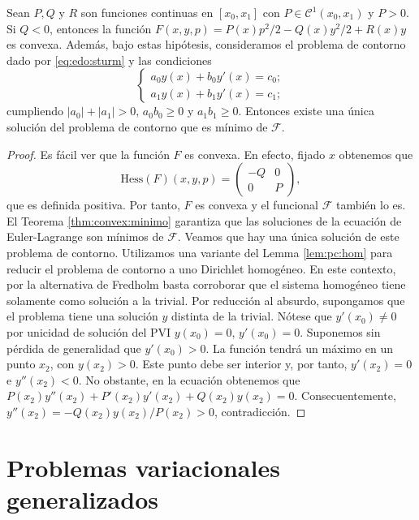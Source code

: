 \documentclass{article}
\begin{document}
\begin{thm} \label{thm:sturm:pv} Sean $P, Q$ y $R$ son funciones continuas en $[x_0, x_1]$ con
  $P \in \mathcal{C}^1(x_0, x_1)$ y $P > 0$. Si $Q < 0$, entonces la función
  $F(x,y,p) = P(x) p^2/2 - Q(x) y^2/2 + R(x)y$ es convexa. Además, bajo estas hipótesis, consideramos el problema
  de contorno dado por \eqref{eq:edo:sturm} y las condiciones
  \begin{equation}
    \begin{cases}
      a_0 y(x) + b_0 y'(x) = c_0; \\
      a_1 y(x) + b_1 y'(x) = c_1;
    \end{cases}
  \end{equation}
  cumpliendo $|a_0| + |a_1| > 0$, $a_0 b_0 \ge 0$ y $a_1b_1 \ge 0$. Entonces existe una única
  solución del problema de contorno que es mínimo de $\mathcal{F}$.
\end{thm}
\begin{proof}
  Es fácil ver que la función $F$ es convexa. En efecto, fijado $x$ obtenemos que
  \[ \mathrm{Hess}(F)(x,y,p) = \left(
      \begin{matrix}
        -Q & 0 \\
        0 & P
      \end{matrix}
    \right), \] que es definida positiva. Por tanto, $F$ es convexa y el funcional $\mathcal{F}$
  también lo es. El Teorema \ref{thm:convex:minimo} garantiza que las soluciones de la ecuación de
  Euler-Lagrange son mínimos de $\mathcal{F}$. Veamos que hay una única solución de este problema de
  contorno. Utilizamos una variante del Lemma \ref{lem:pc:hom} para reducir el problema de contorno
  a uno Dirichlet homogéneo. En este contexto, por la alternativa de Fredholm basta corroborar que
  el sistema homogéneo tiene solamente como solución a la trivial. Por reducción al absurdo,
  supongamos que el problema tiene una solución $y$ distinta de la trivial. Nótese que
  $y'(x_0) \ne 0$ por unicidad de solución del PVI $y(x_0) = 0$, $y'(x_0) = 0$. Suponemos sin
  pérdida de generalidad que $y'(x_0) > 0$. La función tendrá un máximo en un punto $x_2$, con
  $y(x_2) > 0$. Este punto debe ser interior y, por tanto, $y'(x_2) = 0$ e $y''(x_2) < 0$. No
  obstante, en la ecuación obtenemos que $P(x_2)y''(x_2) + P'(x_2)y'(x_2) + Q(x_2) y(x_2) =
  0$. Consecuentemente, $y''(x_2) = - Q(x_2) y(x_2) / P(x_2) > 0$, contradicción.
\end{proof}

\section{Problemas variacionales generalizados}
\end{document}
